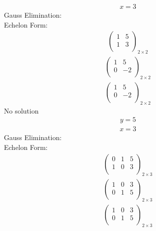 \documentclass{article}
\begin{document}
\begin{align*}
x=3\end{align*}
Gauss Elimination:\\
Echelon Form:\\
\begin{align*}
\left(
\begin{array}{c|c}
1 & 5\\
1 & 3\\
\end{array}
\right)_{2\times 2}
\end{align*}
\begin{align*}
\left(
\begin{array}{c|c}
1 & 5\\
0 & -2\\
\end{array}
\right)_{2\times 2}
\end{align*}
\begin{align*}
\left(
\begin{array}{c|c}
1 & 5\\
0 & -2\\
\end{array}
\right)_{2\times 2}
\end{align*}
No solution\\
\begin{align*}
y=5\end{align*}
\begin{align*}
x=3\end{align*}
Gauss Elimination:\\
Echelon Form:\\
\begin{align*}
\left(
\begin{array}{cc|c}
0 & 1 & 5\\
1 & 0 & 3\\
\end{array}
\right)_{2\times 3}
\end{align*}
\begin{align*}
\left(
\begin{array}{cc|c}
1 & 0 & 3\\
0 & 1 & 5\\
\end{array}
\right)_{2\times 3}
\end{align*}
\begin{align*}
\left(
\begin{array}{cc|c}
1 & 0 & 3\\
0 & 1 & 5\\
\end{array}
\right)_{2\times 3}
\end{align*}
\end{document}

